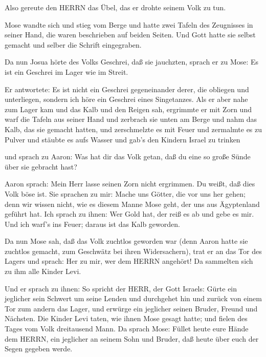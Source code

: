  Also gereute den HERRN das Übel, das er drohte seinem Volk
zu tun.

 Mose wandte sich und stieg vom Berge und hatte zwei Tafeln
des Zeugnisses in seiner Hand, die waren beschrieben auf beiden Seiten.
 Und Gott hatte sie selbst gemacht und selber die Schrift
eingegraben.

 Da nun Josua hörte des Volks Geschrei, daß sie jauchzten,
sprach er zu Mose: Es ist ein Geschrei im Lager wie im Streit.

 Er antwortete: Es ist nicht ein Geschrei gegeneinander
derer, die obliegen und unterliegen, sondern ich höre ein Geschrei eines
Singetanzes.  Als er aber nahe zum Lager kam und das Kalb
und den Reigen sah, ergrimmte er mit Zorn und warf die Tafeln aus seiner
Hand und zerbrach sie unten am Berge  und nahm das Kalb,
das sie gemacht hatten, und zerschmelzte es mit Feuer und zermalmte es
zu Pulver und stäubte es aufs Wasser und gab's den Kindern Israel zu
trinken

 und sprach zu Aaron: Was hat dir das Volk getan, daß du
eine so große Sünde über sie gebracht hast?

 Aaron sprach: Mein Herr lasse seinen Zorn nicht ergrimmen.
Du weißt, daß dies Volk böse ist.  Sie sprachen zu mir:
Mache uns Götter, die vor uns her gehen; denn wir wissen nicht, wie es
diesem Manne Mose geht, der uns aus Ägyptenland geführt hat.
 Ich sprach zu ihnen: Wer Gold hat, der reiß es ab und gebe
es mir. Und ich warf's ins Feuer; daraus ist das Kalb geworden.

 Da nun Mose sah, daß das Volk zuchtlos geworden war (denn
Aaron hatte sie zuchtlos gemacht, zum Geschwätz bei ihren Widersachern),
 trat er an das Tor des Lagers und sprach: Her zu mir, wer
dem HERRN angehört! Da sammelten sich zu ihm alle Kinder Levi.

 Und er sprach zu ihnen: So spricht der HERR, der Gott
Israels: Gürte ein jeglicher sein Schwert um seine Lenden und durchgehet
hin und zurück von einem Tor zum andern das Lager, und erwürge ein
jeglicher seinen Bruder, Freund und Nächsten.  Die Kinder
Levi taten, wie ihnen Mose gesagt hatte; und fielen des Tages vom Volk
dreitausend Mann.  Da sprach Mose: Füllet heute eure Hände
dem HERRN, ein jeglicher an seinem Sohn und Bruder, daß heute über euch
der Segen gegeben werde.

